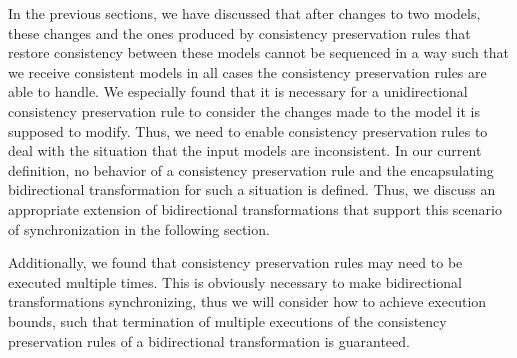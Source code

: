 In the previous sections, we have discussed that after changes to two models, these changes and the ones produced by consistency preservation rules that restore consistency between these models cannot be sequenced in a way such that we receive consistent models in all cases the consistency preservation rules are able to handle.
We especially found that it is necessary for a unidirectional consistency preservation rule to consider the changes made to the model it is supposed to modify.
Thus, we need to enable consistency preservation rules to deal with the situation that the input models are inconsistent.
In our current definition, no behavior of a consistency preservation rule and the encapsulating bidirectional transformation for such a situation is defined.
Thus, we discuss an appropriate extension of bidirectional transformations that support this scenario of synchronization in the following section.

Additionally, we found that consistency preservation rules may need to be executed multiple times.
This is obviously necessary to make bidirectional transformations synchronizing, thus we will consider how to achieve execution bounds, such that termination of multiple executions of the consistency preservation rules of a bidirectional transformation is guaranteed.








    
